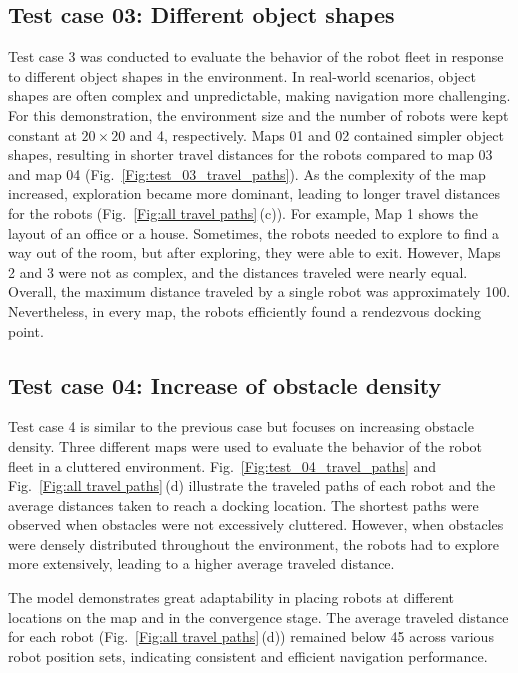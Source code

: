 \documentclass[journal]{IEEEtran}
\begin{document}
\subsection{Test case 03: Different object shapes}
Test case 3 was conducted to evaluate the behavior of the robot fleet in response to different object shapes in the environment. In real-world scenarios, object shapes are often complex and unpredictable, making navigation more challenging.
For this demonstration, the environment size and the number of robots were kept constant at $20 \times 20$ and 4, respectively. Maps 01 and 02 contained simpler object shapes, resulting in shorter travel distances for the robots compared to map 03 and map 04 (Fig.~\ref{Fig:test_03_travel_paths}). As the complexity of the map increased, exploration became more dominant, leading to longer travel distances for the robots (Fig.~\ref{Fig:all travel paths}\,(c)). For example, Map 1 shows the layout of an office or a house. Sometimes, the robots needed to explore to find a way out of the room, but after exploring, they were able to exit. However, Maps 2 and 3 were not as complex, and the distances traveled were nearly equal. Overall, the maximum distance traveled by a single robot was approximately 100. Nevertheless, in every map, the robots efficiently found a rendezvous docking point.

\subsection{Test case 04: Increase of obstacle density}
Test case 4 is similar to the previous case but focuses on increasing obstacle density. Three different maps were used to evaluate the behavior of the robot fleet in a cluttered environment. Fig.~\ref{Fig:test_04_travel_paths} and Fig.~\ref{Fig:all travel paths}\,(d) illustrate the traveled paths of each robot and the average distances taken to reach a docking location. The shortest paths were observed when obstacles were not excessively cluttered. However, when obstacles were densely distributed throughout the environment, the robots had to explore more extensively, leading to a higher average traveled distance.

The model demonstrates great adaptability in placing robots at different locations on the map and in the convergence stage. The average traveled distance for each robot (Fig.~\ref{Fig:all travel paths}\,(d)) remained below 45 across various robot position sets, indicating consistent and efficient navigation performance.
\end{document}
